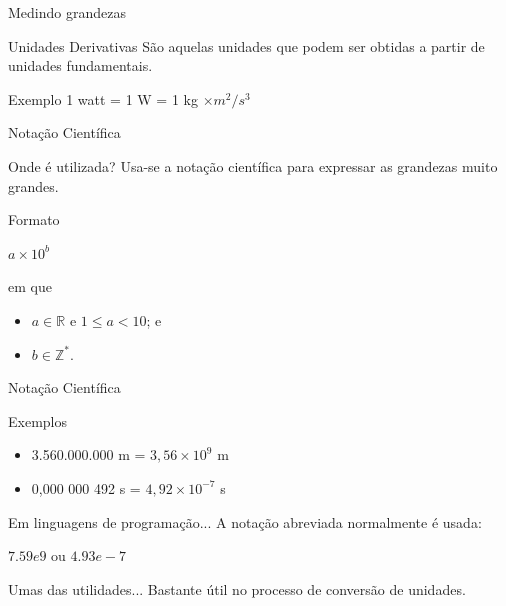 \documentclass[xcolor=dvipsnames,table]{beamer}
\begin{document}
	\begin{frame}{Medindo grandezas}
		\begin{block}{Unidades Derivativas}
			São aquelas unidades que podem ser obtidas a partir de unidades fundamentais.
		\end{block}
		\begin{block}{Exemplo}
			1 watt = 1 W = 1 kg $\times m^2 / s^3$
		\end{block}
	\end{frame}
	
	\begin{frame}{Notação Científica}
		\begin{block}{Onde é utilizada?}
			Usa-se a notação científica para expressar as grandezas muito grandes.
		\end{block}
		\begin{block}{Formato}
			\begin{center}
				$a \times 10^b$
			\end{center}
			em que
			\begin{itemize}
				\item $a \in \mathbb{R}$ e $1 \leq a < 10$; e
				\item $b \in \mathbb{Z}^*$.
			\end{itemize}
		\end{block}
	\end{frame}
	
	\begin{frame}{Notação Científica}
		\begin{block}{Exemplos}
			\begin{itemize}
				\item 3.560.000.000 m = $3,56 \times 10^9$ m
				\item 0,000 000 492 s = $4,92 \times 10^{-7}$ s
			\end{itemize}
		\end{block}
		\begin{block}{Em linguagens de programação...}
			A notação abreviada normalmente é usada: \pause
			\begin{center}
				$7.59 e9$ ou $4.93 e-7$
			\end{center}
		\end{block}
		\begin{block}{Umas das utilidades...}
			Bastante útil no processo de conversão de unidades.
		\end{block}
	\end{frame}
	
\end{document}
